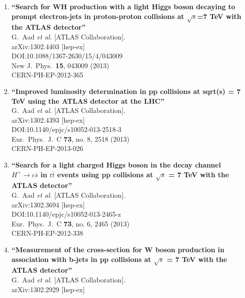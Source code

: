 \documentclass{article}
\begin{document}
\begin{enumerate}
\item%
{\bf ``Search for WH production with a light Higgs boson decaying to prompt electron-jets in proton-proton collisions at $\sqrt{s}$=7 TeV with the ATLAS detector''}
  \\{}G.~Aad {\it et al.} [ATLAS Collaboration].
  \\{}arXiv:1302.4403 [hep-ex]
  \\{}DOI:10.1088/1367-2630/15/4/043009
  \\{}New J.\ Phys.\  {\bf 15}, 043009 (2013)
  \\{}CERN-PH-EP-2012-365
\item%
{\bf ``Improved luminosity determination in pp collisions at sqrt(s) = 7 TeV using the ATLAS detector at the LHC''}
  \\{}G.~Aad {\it et al.} [ATLAS Collaboration].
  \\{}arXiv:1302.4393 [hep-ex]
  \\{}DOI:10.1140/epjc/s10052-013-2518-3
  \\{}Eur.\ Phys.\ J.\ C {\bf 73}, no. 8, 2518 (2013)
  \\{}CERN-PH-EP-2013-026
\item%
{\bf ``Search for a light charged Higgs boson in the decay channel $H^+ \to c\bar{s}$ in $t\bar{t}$ events using pp collisions at $\sqrt{s}$ = 7 TeV with the ATLAS detector''}
  \\{}G.~Aad {\it et al.} [ATLAS Collaboration].
  \\{}arXiv:1302.3694 [hep-ex]
  \\{}DOI:10.1140/epjc/s10052-013-2465-z
  \\{}Eur.\ Phys.\ J.\ C {\bf 73}, no. 6, 2465 (2013)
  \\{}CERN-PH-EP-2012-338
\item%
{\bf ``Measurement of the cross-section for W boson production in association with b-jets in pp collisions at $\sqrt{s}$ = 7 TeV with the ATLAS detector''}
  \\{}G.~Aad {\it et al.} [ATLAS Collaboration].
  \\{}arXiv:1302.2929 [hep-ex]

\end{enumerate}
\end{document}

